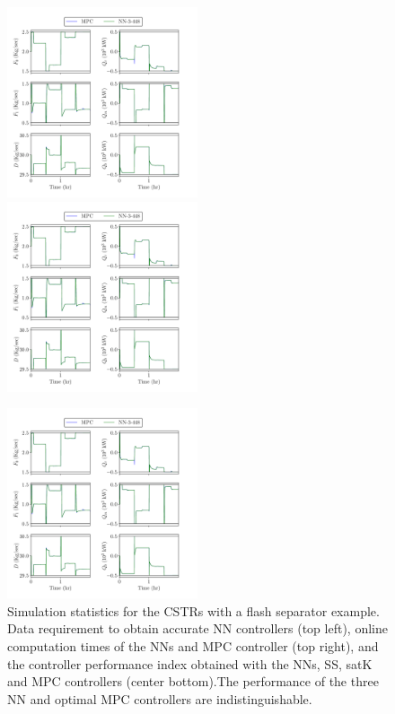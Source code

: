 \documentclass[preprint,5p, twocolumn, authoryear]{elsarticle}
\begin{document}
\begin{figure}[!h]
    \includegraphics[page=31, width=0.5\textwidth,
        height=0.28\textheight]{cstrs_comparision_plots.pdf} \hfill
        \includegraphics[page=34, width=0.5\textwidth,
        height=0.28\textheight]{cstrs_comparision_plots.pdf} \vfill
    \vspace{-0.1in}
    \begin{center}\includegraphics[page=33, width=0.5\textwidth,
        height=0.28\textheight]{cstrs_comparision_plots.pdf}
    \end{center}
    \vspace{-0.2in}
    \caption{Simulation statistics for the  
    CSTRs with a flash separator example. Data requirement to obtain accurate NN
    controllers (top left), online computation times of the NNs and MPC
    controller (top right), and the controller performance index obtained with
    the NNs, SS, satK and MPC controllers (center bottom).The performance of the
    three NN and optimal MPC controllers are indistinguishable.}	
    \label{fig:cstrs_statistics}
\end{figure}
\end{document}

